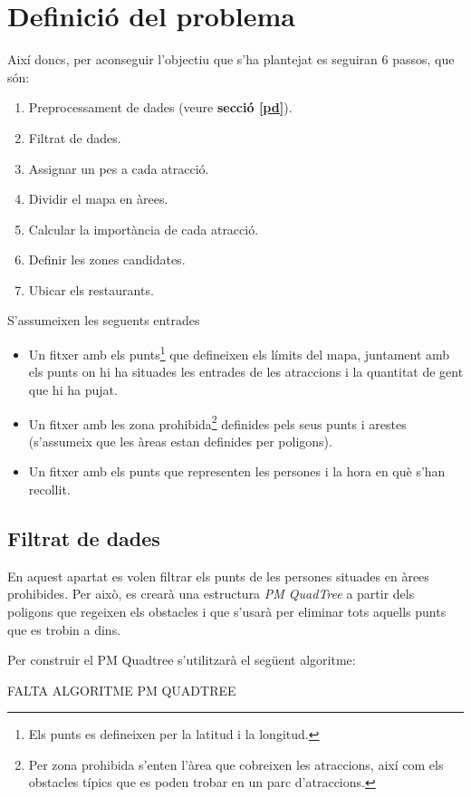 \documentclass[12pt]{article}
\begin{document}
\clearpage
\section{Definició del problema}
Així doncs, per aconseguir l'objectiu que s'ha plantejat es seguiran 6 passos, que són:
\begin{enumerate}
	\item Preprocessament de dades (veure \textbf{secció \ref{pd}}).
	\item Filtrat de dades.
	\item Assignar un pes a cada atracció.
	\item Dividir el mapa en àrees.
	\item Calcular la importància de cada atracció.
	\item Definir les zones candidates.
	\item Ubicar els restaurants.
\end{enumerate}

S'assumeixen les seguents entrades
\begin{itemize}
	\item Un fitxer amb els punts\footnote{Els punts es defineixen per la latitud i la longitud.} que defineixen els límits del mapa, juntament amb els punts on hi ha situades les entrades de les atraccions i la quantitat de gent que hi ha pujat.
	\item Un fitxer amb les zona prohibida\footnote{Per zona prohibida s'enten l'àrea que cobreixen les atraccions, així com els obstacles típics que es poden trobar en un parc d'atraccions.} definides pels seus punts i arestes (s'assumeix que les àreas estan definides per poligons).
	\item Un fitxer amb els punts que representen les persones i la hora en què s'han recollit.
\end{itemize}

\subsection{Filtrat de dades}
En aquest apartat es volen filtrar els punts de les persones situades en àrees prohibides. Per això, es crearà una estructura \textit{PM QuadTree} a partir dels poligons que regeixen els obstacles i que s'usarà per eliminar tots aquells punts que es trobin a dins.

Per construir el PM Quadtree s'utilitzarà el següent algoritme:

FALTA ALGORITME PM QUADTREE
\end{document}

